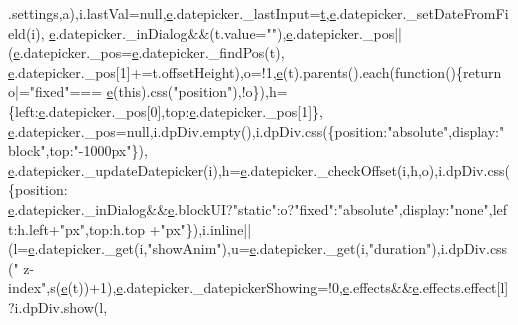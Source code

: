 \begin{DoxyCode}
      .settings,a),i.lastVal=null,\hyperlink{jquery-ui_8min_8js_a2c038346d47955cbe2cb91e338edd7e1}{e}.datepicker.\_lastInput=\hyperlink{jquery-2_80_83_8min_8js_aaccc9105df5383111407fd5b41255e23}{t},\hyperlink{jquery-ui_8min_8js_a2c038346d47955cbe2cb91e338edd7e1}{e}.datepicker.\_setDateFromField(i),
      \hyperlink{jquery-ui_8min_8js_a2c038346d47955cbe2cb91e338edd7e1}{e}.datepicker.\_inDialog&&(t.value=\textcolor{stringliteral}{""}),\hyperlink{jquery-ui_8min_8js_a2c038346d47955cbe2cb91e338edd7e1}{e}.datepicker.\_pos||(\hyperlink{jquery-ui_8min_8js_a2c038346d47955cbe2cb91e338edd7e1}{e}.datepicker.\_pos=\hyperlink{jquery-ui_8min_8js_a2c038346d47955cbe2cb91e338edd7e1}{e}.datepicker.\_findPos(t),
      \hyperlink{jquery-ui_8min_8js_a2c038346d47955cbe2cb91e338edd7e1}{e}.datepicker.\_pos[1]+=t.offsetHeight),o=!1,\hyperlink{jquery-ui_8min_8js_a2c038346d47955cbe2cb91e338edd7e1}{e}(t).parents().each(\textcolor{keyword}{function}()\{\textcolor{keywordflow}{return} o|=\textcolor{stringliteral}{"fixed"}===
      \hyperlink{jquery-ui_8min_8js_a2c038346d47955cbe2cb91e338edd7e1}{e}(\textcolor{keyword}{this}).css(\textcolor{stringliteral}{"position"}),!o\}),h=\{left:\hyperlink{jquery-ui_8min_8js_a2c038346d47955cbe2cb91e338edd7e1}{e}.datepicker.\_pos[0],top:\hyperlink{jquery-ui_8min_8js_a2c038346d47955cbe2cb91e338edd7e1}{e}.datepicker.\_pos[1]\},
      \hyperlink{jquery-ui_8min_8js_a2c038346d47955cbe2cb91e338edd7e1}{e}.datepicker.\_pos=null,i.dpDiv.empty(),i.dpDiv.css(\{position:\textcolor{stringliteral}{"absolute"},display:\textcolor{stringliteral}{"block"},top:\textcolor{stringliteral}{"-1000px"}\}),
      \hyperlink{jquery-ui_8min_8js_a2c038346d47955cbe2cb91e338edd7e1}{e}.datepicker.\_updateDatepicker(i),h=\hyperlink{jquery-ui_8min_8js_a2c038346d47955cbe2cb91e338edd7e1}{e}.datepicker.\_checkOffset(i,h,o),i.dpDiv.css(\{position:
      \hyperlink{jquery-ui_8min_8js_a2c038346d47955cbe2cb91e338edd7e1}{e}.datepicker.\_inDialog&&\hyperlink{jquery-ui_8min_8js_a2c038346d47955cbe2cb91e338edd7e1}{e}.blockUI?\textcolor{stringliteral}{"static"}:o?\textcolor{stringliteral}{"fixed"}:\textcolor{stringliteral}{"absolute"},display:\textcolor{stringliteral}{"none"},left:h.left+\textcolor{stringliteral}{"px"},top:h.top
      +\textcolor{stringliteral}{"px"}\}),i.inline||(l=\hyperlink{jquery-ui_8min_8js_a2c038346d47955cbe2cb91e338edd7e1}{e}.datepicker.\_get(i,\textcolor{stringliteral}{"showAnim"}),u=\hyperlink{jquery-ui_8min_8js_a2c038346d47955cbe2cb91e338edd7e1}{e}.datepicker.\_get(i,\textcolor{stringliteral}{"duration"}),i.dpDiv.css(\textcolor{stringliteral}{"
      z-index"},s(\hyperlink{jquery-ui_8min_8js_a2c038346d47955cbe2cb91e338edd7e1}{e}(t))+1),\hyperlink{jquery-ui_8min_8js_a2c038346d47955cbe2cb91e338edd7e1}{e}.datepicker.\_datepickerShowing=!0,\hyperlink{jquery-ui_8min_8js_a2c038346d47955cbe2cb91e338edd7e1}{e}.effects&&\hyperlink{jquery-ui_8min_8js_a2c038346d47955cbe2cb91e338edd7e1}{e}.effects.effect[l]?i.dpDiv.show(l,

\end{DoxyCode}
